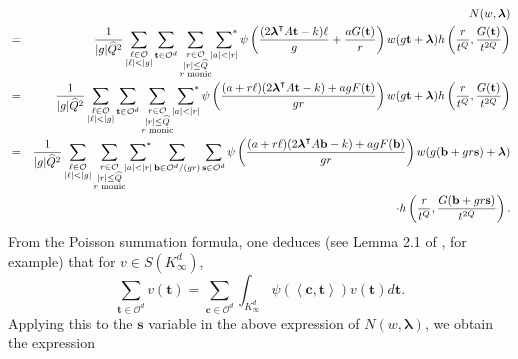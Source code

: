 \documentclass[10pt]{amsart}
\theoremstyle{plain}
\theoremstyle{plain}
\renewcommand{\vec}[1]{\mathbf{#1}}
\theoremstyle{remark}
\theoremstyle{definition}
\renewcommand{\hat}{\widehat}
\newcommand{\Ki}{K_\infty}
\newcommand{\hQ}{\widehat{Q}}
\newcommand{\sumstar}{\sideset{}{^*}\sum}
\newcommand{\cO}{\mathcal{O}}
\begin{document}
\begin{eqnarray*}
&&N(w,\boldsymbol{\lambda})\\&=&
\frac{1}{|g|\hQ^2}\sum_{\substack{\ell\in \cO\\ |\ell|<|g|}}\sum_{\vec{t}\in\mathcal{O}^d}
\sum_{\substack{
r\in \cO\\
|r|\leq \hat Q\\
\text{$r$ monic}
} }
\sumstar_{\substack{
|a|<|r|} }\psi\left(\frac{(2\boldsymbol{\lambda}^{\intercal} A\vec{t}-k)\ell}{g}+\frac{aG(\vec{t})}{r}\right)w(g\vec{t}+\boldsymbol{\lambda})h\left(\frac{r}{t^Q},\frac{G(\vec{t})}{t^{2Q}}\right)\\ &=& \frac{1}{|g|\hQ^2}\sum_{\substack{\ell\in \cO\\ |\ell|<|g|}}\sum_{\vec{t}\in\mathcal{O}^d}
\sum_{\substack{
r\in \cO\\
|r|\leq \hat Q\\
\text{$r$ monic}
} }
\sumstar_{\substack{
|a|<|r|} }\psi\left(\frac{(a+r\ell)(2\boldsymbol{\lambda}^{\intercal} A\vec{t}-k)+agF(\vec{t})}{gr}\right)w(g\vec{t}+\boldsymbol{\lambda})h\left(\frac{r}{t^Q},\frac{G(\vec{t})}{t^{2Q}}\right)\\&=&\frac{1}{|g|\hQ^2}\sum_{\substack{\ell\in \cO\\ |\ell|<|g|}}
\sum_{\substack{
r\in \cO\\
|r|\leq \hat Q\\
\text{$r$ monic}
} }
\sumstar_{\substack{
|a|<|r|} }\sum_{\vec{b}\in\mathcal{O}^d/(gr)}\sum_{\vec{s}\in\mathcal{O}^d}\psi\left(\frac{(a+r\ell)(2\boldsymbol{\lambda}^{\intercal} A\vec{b}-k)+agF(\vec{b})}{gr}\right)w(g(\vec{b}+gr\vec{s})+\boldsymbol{\lambda})\\&&\cdot h\left(\frac{r}{t^Q},\frac{G(\vec{b}+gr\vec{s})}{t^{2Q}}\right).
\end{eqnarray*}
From the Poisson summation formula, one deduces (see Lemma 2.1 of \cite{Browning}, for example) that for $v\in S(\Ki^d)$,
\[\sum_{\vec{t}\in\mathcal{O}^d}v(\vec{t})=\sum_{\vec{c}\in\mathcal{O}^d}\int_{\Ki^d}\psi(\left<\vec{c},\vec{t}\right>)v(\vec{t})d\vec{t}.\]
Applying this to the $\vec{s}$ variable in the above expression of $N(w,\boldsymbol{\lambda})$, we obtain the expression
\end{document}
